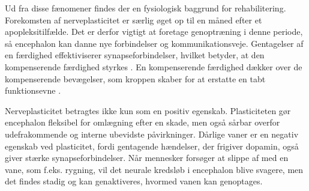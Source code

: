 \noindent Ud fra disse fænomener findes der en fysiologisk baggrund for rehabilitering. Forekomsten af nerveplasticitet er særlig øget op til en måned efter et apopleksitilfælde. Det er derfor vigtigt at foretage genoptræning i denne periode, så encephalon kan danne nye forbindelser og kommunikationsveje. \cite{Rugnett2015} Gentagelser af en færdighed effektiviserer synapseforbindelser, hvilket betyder, at den kompenserende færdighed styrkes \cite{Stanfield2014}. En kompenserende færdighed dækker over de kompenserende bevægelser, som kroppen skaber for at erstatte en tabt funktionsevne \cite{Takeuchi2012,Leea2009}.

Nerveplasticitet betragtes ikke kun som en positiv egenskab. Plasticiteten gør encephalon fleksibel for omlægning efter en skade, men også sårbar overfor udefrakommende og interne ubevidste påvirkninger. Dårlige vaner er en negativ egenskab ved plasticitet, fordi gentagende hændelser, der frigiver dopamin, også giver stærke synapseforbindelser. Når mennesker forsøger at slippe af med en vane, som f.eks. rygning, vil det neurale kredsløb i encephalon blive svagere, men det findes stadig og kan genaktiveres, hvormed vanen kan genoptages. \cite{Hampton2015}




